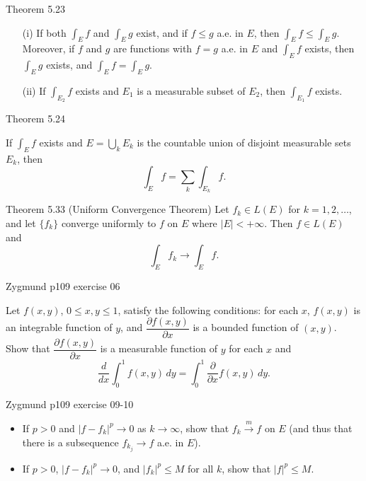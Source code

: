 \documentclass[UTF8,a4paper,10pt]{article}
\begin{document}
\begin{mybox}{Theorem 5.23}
\begin{enumerate}
  \item[(i)] If both $\int_E f$ and $\int_E g$ exist, and if $f \leq g$ a.e. in $E$, then $\int_E f \leq \int_E g$. Moreover, if $f$ and $g$ are functions with $f = g$ a.e. in $E$ and $\int_E f$ exists, then $\int_E g$ exists, and $\int_E f = \int_E g$.

  \item[(ii)] If $\int_{E_2} f$ exists and $E_1$ is a measurable subset of $E_2$, then $\int_{E_1} f$ exists.
\end{enumerate}
\end{mybox}

\begin{mybox}{Theorem 5.24}

  If $\int_E f$ exists and $E = \bigcup_k E_k$ is the countable union of disjoint measurable sets $E_k$, then
  \[
    \int_E f = \sum_k \int_{E_k} f.
  \]
  
  \end{mybox}

\begin{mybox}{Theorem 5.33 (Uniform Convergence Theorem)}
  Let $f_k \in L(E)$ for $k = 1, 2, \ldots$, and let $\{f_k\}$ converge uniformly to $f$ on $E$ where $|E| < +\infty$. Then $f \in L(E)$ and
  \[
    \int_E f_k \to \int_E f .
  \]

\end{mybox}





\begin{Problem}[]{Zygmund p109 exercise 06}



Let $f(x, y)$, $0 \leq x, y \leq 1$, satisfy the following conditions: for each $x$, $f(x, y)$ is an integrable function of $y$, and $\dfrac{\partial f(x, y)}{\partial x}$ is a bounded function of $(x, y)$. Show that $\dfrac{\partial f(x, y)}{\partial x}$ is a measurable function of $y$ for each $x$ and
\[
\frac{d}{dx} \int_{0}^{1} f(x, y) \,dy = \int_{0}^{1} \frac{\partial}{\partial x} f(x, y) \,dy.
\]

\end{Problem}


\begin{Problem}[]{Zygmund p109 exercise 09-10}
  \begin{itemize}
    \item   If $p > 0$ and $|f - f_k|^p \rightarrow 0$ as $k \rightarrow \infty$, show that $f_k \overset{m}{\longrightarrow} f$ on $E$ (and thus that there is a subsequence $f_{k_j} \rightarrow f$ a.e. in $E$).
    \item   If $p > 0$, $|f - f_k|^p \rightarrow 0$, and $|f_k|^p \leq M$ for all $k$, show that $|f|^p \leq M$.

  \end{itemize}

\end{Problem}
\end{document}

